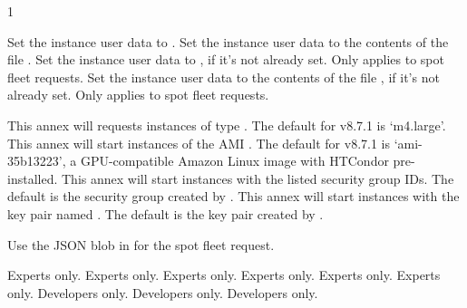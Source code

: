 \begin{ManPage}{\label{man-condor-annex}}{1}
\begin{Options}
		{Set the instance user data to .}
		{Set the instance user data to the contents of the file .}
		{Set the instance user data to , if it's not already set.  Only applies to spot fleet requests.}
		{Set the instance user data to the contents of the file , if it's not already set.  Only applies to spot fleet requests.}

		{This annex will requests instances of type .  The default for v8.7.1 is `m4.large'.}
		{This annex will start instances of the AMI .  The default for v8.7.1 is `ami-35b13223', a GPU-compatible Amazon Linux image with HTCondor pre-installed.}
		{This annex will start instances with the listed security group IDs.  The default is the security group created by .}
		{This annex will start instances with the key pair named .  The default is the key pair created by .}

		{Use the JSON blob in  for the spot fleet request.}

	 {Experts only.}
	 {Experts only.}
	 {Experts only.}
	 {Experts only.}
	 {Experts only.}
	 {Experts only.}
	 {Developers only.}
	 {Developers only.}
	 {Developers only.}
\end{Options}


\end{ManPage}

